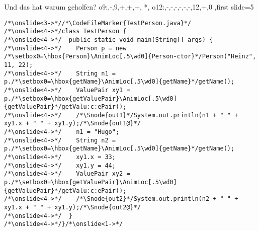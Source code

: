 {\begin{frame}[fragile,t]{Und das hat warum geholfen?}
{{    o9:{},-,9,+,+,+,
    *,
    o12:{},-,-,-,-,-,-,12,+,0
},first slide=5}
\begin{verbatim}
/*\onslide<3->*//*\CodeFileMarker{TestPerson.java}*/
/*\onslide<4->*/class TestPerson {
/*\onslide<4->*/  public static void main(String[] args) {
/*\onslide<4->*/    Person p = new /*\setbox0=\hbox{Person}\AnimLoc[.5\wd0]{Person-ctor}*/Person("Heinz", 11, 22);
/*\onslide<4->*/    String n1 = p./*\setbox0=\hbox{getName}\AnimLoc[.5\wd0]{getName}*/getName();
/*\onslide<4->*/    ValuePair xy1 = p./*\setbox0=\hbox{getValuePair}\AnimLoc[.5\wd0]{getValuePair}*/getValu:c:ePair();
/*\onslide<4->*/    /*\Snode{out1}*/System.out.println(n1 + " " + xy1.x + " " + xy1.y);/*\Snode{out1@}*/
/*\onslide<4->*/    n1 = "Hugo";
/*\onslide<4->*/    String n2 = p./*\setbox0=\hbox{getName}\AnimLoc[.5\wd0]{getName}*/getName();
/*\onslide<4->*/    xy1.x = 33;
/*\onslide<4->*/    xy1.y = 44;
/*\onslide<4->*/    ValuePair xy2 = p./*\setbox0=\hbox{getValuePair}\AnimLoc[.5\wd0]{getValuePair}*/getValu:c:ePair();
/*\onslide<4->*/    /*\Snode{out2}*/System.out.println(n2 + " " + xy1.x + " " + xy1.y);/*\Snode{out2@}*/
/*\onslide<4->*/  }
/*\onslide<4->*/}/*\onslide<1->*/
\end{verbatim}
\endAnimateCode{}
\endcolumns
{}
\end{frame}}
